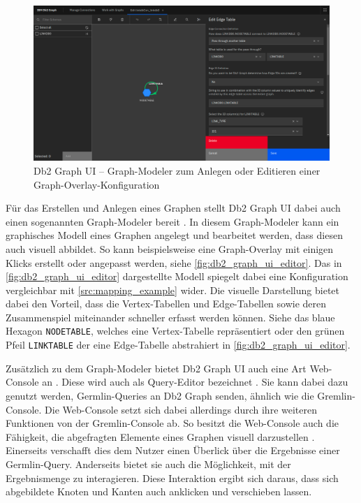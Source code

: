 \begin{figure}[h]
    \centering
    \includegraphics[width=\textwidth]{images/db2_graph_editor.png}
    \vspace{0.1em}
    \caption[Db2 Graph UI -- Graph-Modeler]{Db2 Graph UI -- Graph-Modeler zum Anlegen oder Editieren einer Graph-Overlay-Konfiguration}
    \label{fig:db2_graph_ui_editor}
\end{figure}

Für das Erstellen und Anlegen eines Graphen stellt Db2 Graph UI dabei auch einen sogenannten Graph-Modeler bereit \cite{ibm_docs_db2_graph_ui}. In diesem Graph-Modeler kann ein graphisches Modell eines Graphen angelegt und bearbeitet werden, dass diesen auch visuell abbildet. So kann beispielsweise eine Graph-Overlay mit einigen Klicks erstellt oder angepasst werden, siehe \autoref{fig:db2_graph_ui_editor}. Das in \autoref{fig:db2_graph_ui_editor} dargestellte Modell spiegelt dabei eine Konfiguration vergleichbar mit \autoref{src:mapping_example} wider. Die visuelle Darstellung bietet dabei den Vorteil, dass die Vertex-Tabellen und Edge-Tabellen sowie deren Zusammenspiel miteinander schneller erfasst werden können. Siehe das blaue Hexagon \texttt{NODETABLE}, welches eine Vertex-Tabelle repräsentiert oder den grünen Pfeil \texttt{LINKTABLE} der eine Edge-Tabelle abstrahiert in \autoref{fig:db2_graph_ui_editor}.

Zusätzlich zu dem Graph-Modeler bietet Db2 Graph UI auch eine Art Web-Console an \cite{ibm_docs_db2_graph_ui}. Diese wird auch als Query-Editor bezeichnet \cite{ibm_docs_db2_graph_ui}. Sie kann dabei dazu genutzt werden, Germlin-Queries an Db2 Graph senden, ähnlich wie die Gremlin-Console. Die Web-Console setzt sich dabei allerdings durch ihre weiteren Funktionen von der Gremlin-Console ab. So besitzt die Web-Console auch die Fähigkeit, die abgefragten Elemente eines Graphen visuell darzustellen \cite{ibm_docs_db2_graph_ui}. Einerseits verschafft dies dem Nutzer einen Überlick über die Ergebnisse einer Germlin-Query. Anderseits bietet sie auch die Möglichkeit, mit der Ergebnismenge zu interagieren. Diese Interaktion ergibt sich daraus, dass sich abgebildete Knoten und Kanten auch anklicken und verschieben lassen.

